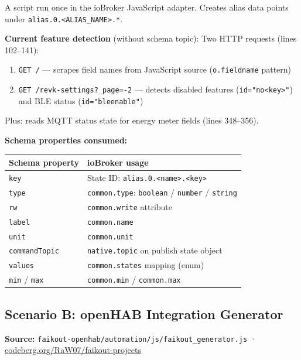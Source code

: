 \documentclass[11pt,a4paper]{article}
\begin{document}
A script run once in the ioBroker JavaScript adapter. Creates alias data points under \texttt{alias.0.\textless ALIAS\_NAME\textgreater.*}.

\textbf{Current feature detection} (without schema topic): Two HTTP requests (lines 102–141):
\begin{enumerate}[noitemsep]
  \item \texttt{GET /} — scrapes field names from JavaScript source (\texttt{o.fieldname} pattern)
  \item \texttt{GET /revk-settings?\_page=-2} — detects disabled features (\texttt{id="no\textless key\textgreater"}) and BLE status (\texttt{id="bleenable"})
\end{enumerate}
Plus: reads MQTT status state for energy meter fields (lines 348–356).

\textbf{Schema properties consumed:}

\begin{tabular}{@{}ll@{}}
\toprule
\textbf{Schema property} & \textbf{ioBroker usage} \\
\midrule
\rowcolor{lightbg}
\texttt{key}          & State ID: \texttt{alias.0.\textless name\textgreater.\textless key\textgreater} \\
\texttt{type}         & \texttt{common.type}: \texttt{boolean} / \texttt{number} / \texttt{string} \\
\rowcolor{lightbg}
\texttt{rw}           & \texttt{common.write} attribute \\
\texttt{label}        & \texttt{common.name} \\
\rowcolor{lightbg}
\texttt{unit}         & \texttt{common.unit} \\
\texttt{commandTopic} & \texttt{native.topic} on publish state object \\
\rowcolor{lightbg}
\texttt{values}       & \texttt{common.states} mapping (enum) \\
\texttt{min} / \texttt{max} & \texttt{common.min} / \texttt{common.max} \\
\bottomrule
\end{tabular}

\subsection{Scenario B: openHAB Integration Generator}

\textbf{Source:} \texttt{faikout-openhab/automation/js/faikout\_generator.js} · \href{https://codeberg.org/RaW07/faikout-projects}{codeberg.org/RaW07/faikout-projects}
\end{document}
